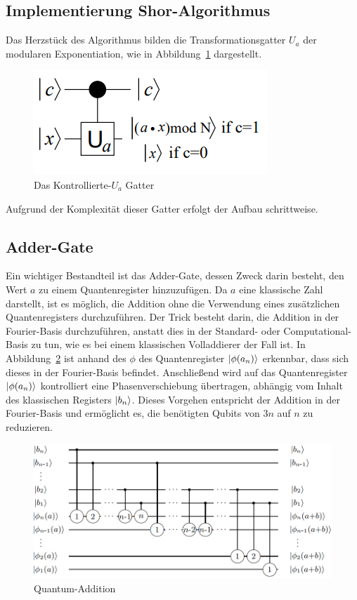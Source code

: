 \documentclass[
  a4paper, %
  10pt, %
  unnumberedsections, %
  twoside, %
]{LTJournalArticle}
\begin{document}
\subsection{\Large Implementierung Shor-Algorithmus}
Das Herzstück des Algorithmus bilden die Transformationsgatter $U_a$ der modularen Exponentiation,
wie in Abbildung~\ref{fig:c-Ugate} dargestellt.
\begin{figure}[h]
\caption{Das Kontrollierte-$U_a$ Gatter~\autocite{beauregard2003circuit}}
\label{fig:c-Ugate}
\includegraphics[scale=0.8]{c-Ugate.PNG}
\centering
\end{figure}
Aufgrund der Komplexität dieser Gatter erfolgt der Aufbau schrittweise.
\subsection{\large Adder-Gate}
Ein wichtiger Bestandteil ist das Adder-Gate, dessen Zweck darin besteht,
den Wert $a$ zu einem Quantenregister hinzuzufügen.
Da $a$ eine klassische Zahl darstellt, ist es möglich,
die Addition ohne die Verwendung eines zusätzlichen Quantenregisters durchzuführen.
Der Trick besteht darin, die Addition in der Fourier-Basis durchzuführen,
anstatt dies in der Standard- oder Computational-Basis zu tun,
wie es bei einem klassischen Volladdierer der Fall ist.
In Abbildung~\ref{fig:Quantum-Addition} ist anhand des $\phi$ des Quantenregister $\ket{\phi(a_n)}$ erkennbar,
dass sich dieses in der Fourier-Basis befindet.
Anschließend wird auf das Quantenregister $\ket{\phi(a_n)}$ kontrolliert eine Phasenverschiebung übertragen,
abhängig vom Inhalt des klassischen Registers $\ket{b_n}$.
Dieses Vorgehen entspricht der Addition in der Fourier-Basis und ermöglicht es,
die benötigten Qubits von $3n$ auf $n$ zu reduzieren.
\begin{figure}[h]
\caption{Quantum-Addition~\autocite{draper2000addition}}
\label{fig:Quantum-Addition}
\includegraphics[scale=0.4]{Quantum-Addition.PNG}
\centering
\end{figure}
\end{document}
